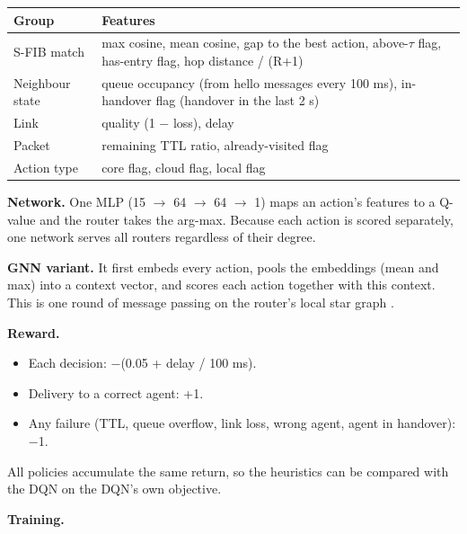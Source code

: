\documentclass[journal]{IEEEtran}
\begin{document}
\begin{table}[!t]
\centering
\footnotesize
\begin{tabularx}{\textwidth}{>{\hsize=0.560\hsize\raggedright\arraybackslash}X>{\hsize=1.440\hsize\raggedright\arraybackslash}X}
\toprule
Group & Features \\
\midrule
S-FIB match & max cosine, mean cosine, gap to the best action, above-$\tau$ flag, has-entry flag, hop distance / (R+1) \\
Neighbour state & queue occupancy (from hello messages every 100 ms), in-handover flag (handover in the last 2 s) \\
Link & quality (1 $-$ loss), delay \\
Packet & remaining TTL ratio, already-visited flag \\
Action type & core flag, cloud flag, local flag \\
\bottomrule
\end{tabularx}
\end{table}

\textbf{Network.} One MLP (15 $\rightarrow$ 64 $\rightarrow$ 64 $\rightarrow$ 1) maps an action's features to a Q-value and the router takes the arg-max. Because each action is scored separately, one network serves all routers regardless of their degree.

\textbf{GNN variant.} It first embeds every action, pools the embeddings (mean and max) into a context vector, and scores each action together with this context. This is one round of message passing on the router's local star graph \cite{ref10}.

\textbf{Reward.}

\begin{itemize}
\item Each decision: $-$(0.05 + delay / 100 ms).
\item Delivery to a correct agent: +1.
\item Any failure (TTL, queue overflow, link loss, wrong agent, agent in handover): $-$1.
\end{itemize}

All policies accumulate the same return, so the heuristics can be compared with the DQN on the DQN's own objective.

\textbf{Training.}
\end{document}
